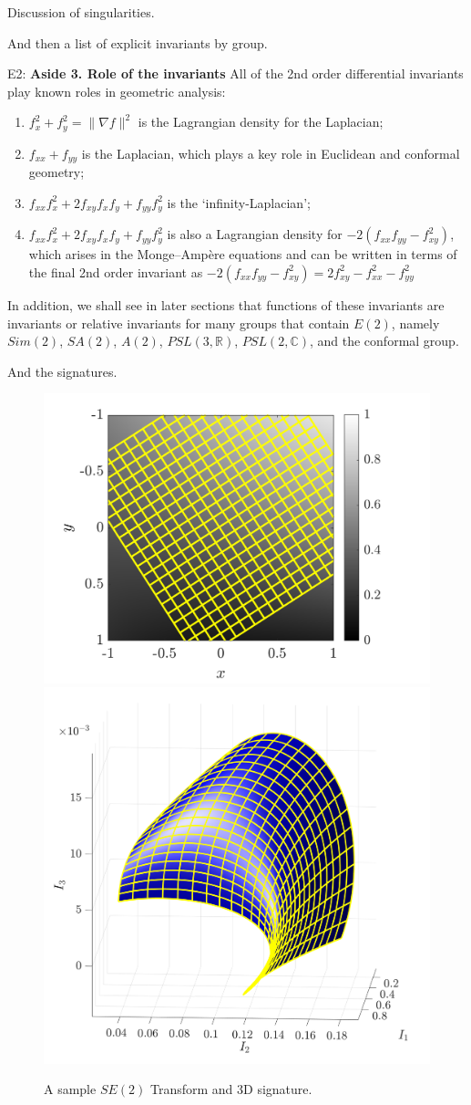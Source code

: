 \documentclass[review,onefignum,onetabnum]{siamonline190516}
\begin{document}
Discussion of singularities. 

And then a list of explicit invariants by group.

E2:
{\bf Aside 3. Role of the invariants} 
All of the 2nd order differential invariants play known roles in geometric analysis:
\begin{enumerate}
\item $f_x^2 + f_y^2=\|\nabla f\|^2$ is the Lagrangian density for the Laplacian;
\item $f_{xx} + f_{yy}$ is the Laplacian, which plays a key role in Euclidean and conformal geometry;
\item $f_{xx}f_x^2 + 2 f_{xy} f_x f_y + f_{yy} f_y^2 $ is the `infinity-Laplacian'; 
\item $f_{xx}f_x^2 + 2 f_{xy} f_x f_y + f_{yy} f_y^2 $ is also a Lagrangian density for $-2(f_{xx} f_{yy} - f_{xy}^2)$, which arises in the Monge--Amp\`ere equations and
can be written in terms of the final 2nd order invariant as $-2 (f_{xx} f_{yy} - f_{xy}^2) = 2 f_{xy}^2 - f_{xx}^2 - f_{yy}^2$
\end{enumerate}
In addition, we shall see in later sections that functions of these invariants are invariants or
relative invariants for many groups that contain $E(2)$, namely $Sim(2)$, $SA(2)$, $A(2)$, $PSL(3,\mathbb{R})$, $PSL(2,\mathbb{C})$, and the conformal group.

And the signatures.

\begin{figure}
\centering
\includegraphics[width=.45\textwidth]{Figs/f_transformed_SE2.png}
\includegraphics[width=.45\textwidth]{Figs/SE2_signature.png}
\caption{A sample $SE(2)$ Transform and 3D signature.}
\label{fig:SE2}
\end{figure}
\end{document}

